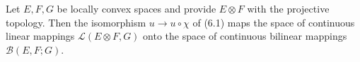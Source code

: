 Let $E, F, G$ be locally convex spaces and provide $E \otimes F$ with the projective topology. Then the isomorphism $u \rightarrow u \circ \chi$ of (6.1) maps the space of continuous linear mappings $\mathcal{L}(E \otimes F, G)$ onto the space of continuous bilinear mappings $\mathcal{B}(E, F; G)$.
